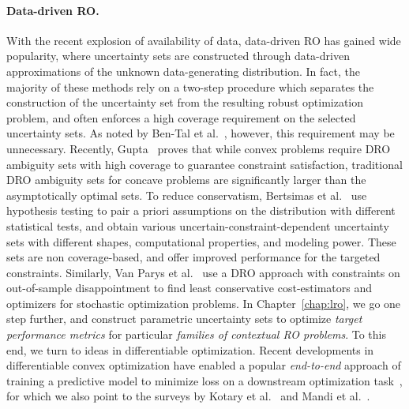 \paragraph{Data-driven \gls{RO}.}
With the recent explosion of availability of data, data-driven \gls{RO} has gained wide popularity, where uncertainty sets are constructed through data-driven approximations of the unknown data-generating distribution.
In fact, the majority of these methods rely on a two-step procedure which separates the construction of the uncertainty set from the resulting robust optimization problem, and often enforces a high coverage requirement on the selected uncertainty sets.
As noted by Ben-Tal et al.~\cite{ben-tal_robust_2009}, however, this requirement may be unnecessary.
Recently, Gupta~\cite{gupta} proves that while convex problems require \gls{DRO} ambiguity sets with high coverage to guarantee constraint satisfaction, traditional \gls{DRO} ambiguity sets for concave problems are significantly larger than the asymptotically optimal sets.
To reduce conservatism, Bertsimas et al.~\cite{bertsimas_data-driven_2018} use hypothesis testing to pair a priori assumptions on the distribution with different statistical tests, and obtain various uncertain-constraint-dependent uncertainty sets with different shapes, computational properties, and modeling power. These sets are non coverage-based, and offer improved performance for the targeted constraints.
Similarly, Van Parys et al.~\cite{vanparys2021data} use a \gls{DRO} approach with constraints on out-of-sample disappointment to find least conservative cost-estimators and optimizers for stochastic optimization problems.
In Chapter~\ref{chap:lro}, we go
one step further, and construct parametric uncertainty sets to optimize {\it target performance metrics} for particular {\it families of contextual \gls{RO} problems}. To this end, we turn to ideas in differentiable optimization.
Recent developments in differentiable convex optimization have enabled a popular {\it end-to-end} approach of training a predictive model to minimize loss on a downstream optimization task~\citep{amos1, end1,end2,end3,end-to-end,predict_opt}, for which we also point to the surveys by Kotary et al.~\cite{end-survey} and Mandi et al.~\cite{dfl}.
